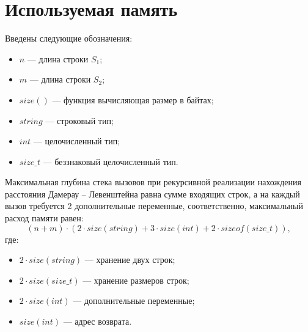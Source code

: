 \clearpage

\section{Используемая память}

Введены следующие обозначения:
\begin{itemize}
	\item$n$ --- длина строки $S_{1}$;
	\item$m$ --- длина строки $S_{2}$;
	\item$size()$ --- функция вычисляющая размер в байтах;
	\item $string$ --- строковый тип;
	\item $int$ --- целочисленный тип;
	\item $size\_t$ --- беззнаковый целочисленный тип.
\end{itemize}

Максимальная глубина стека вызовов при рекурсивной реализации нахождения расстояния Дамерау -- Левенштейна равна сумме входящих строк, а на каждый вызов требуется 2 дополнительные переменные, соответственно, максимальный расход памяти равен:
\begin{equation}
	\label{eq:dl_rec_memory}
	(n + m) \cdot (2 \cdot size(string) + 3 \cdot size(int) + 2 \cdot sizeof(size\_t)),
\end{equation}
где:
\begin{itemize}
	\item $2 \cdot size(string)$ --- хранение двух строк;
	\item $2 \cdot size(size\_t)$ --- хранение размеров строк;
	\item $2 \cdot size(int)$ --- дополнительные переменные;
	\item $size(int)$ --- адрес возврата.
\end{itemize}


